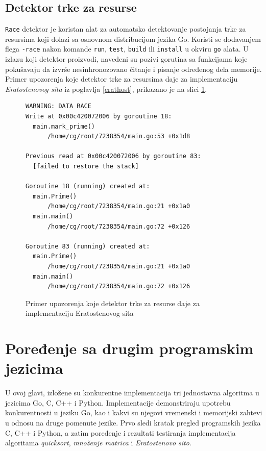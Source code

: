 \documentclass[12pt,oneside]{memoir}
\begin{document}
\section{Detektor trke za resurse} \label{datarace}

\texttt{Race} detektor je koristan alat za automatsko detektovanje postojanja trke za resursima koji dolazi sa osnovnom distribucijom jezika Go. Koristi se dodavanjem flega \texttt{-race} nakon komande \texttt{run}, \texttt{test}, \texttt{build} ili \texttt{install} u okviru \texttt{go} alata. U izlazu koji detektor proizvodi, navedeni su pozivi gorutina sa funkcijama koje pokušavaju da izvrše nesinhronozovano čitanje i pisanje određenog dela memorije. Primer upozorenja koje detektor trke za resursima daje za implementaciju \textit{Eratostenovog sita} iz poglavlja \ref{erathost}, prikazano je na slici \ref{fig:datarace}.

\begin{figure}
\begin{center}

\begin{Verbatim}[fontsize=\small]
WARNING: DATA RACE
Write at 0x00c420072006 by goroutine 18:
  main.mark_prime()
      /home/cg/root/7238354/main.go:53 +0x1d8

Previous read at 0x00c420072006 by goroutine 83:
  [failed to restore the stack]

Goroutine 18 (running) created at:
  main.Prime()
      /home/cg/root/7238354/main.go:21 +0x1a0
  main.main()
      /home/cg/root/7238354/main.go:72 +0x126

Goroutine 83 (running) created at:
  main.Prime()
      /home/cg/root/7238354/main.go:21 +0x1a0
  main.main()
      /home/cg/root/7238354/main.go:72 +0x126
\end{Verbatim}

\caption{Primer upozorenja koje detektor trke za resurse daje za implementaciju Eratostenovog sita}
\label{fig:datarace}
\end{center}
\end{figure}



\chapter {Poređenje sa drugim programskim jezicima}
U ovoj glavi, izložene su konkurentne implementacija tri jednostavna algoritma u jezicima Go, C, C++ i Python.  Implementacije demonstriraju upotrebu konkurentnosti u jeziku Go, kao i kakvi su njegovi vremenski i memorijski zahtevi u odnosu na druge pomenute jezike. Prvo sledi kratak pregled programskih jezika C, C++ i Python, a zatim poređenje i rezultati testiranja implementacija algoritama \textit{quicksort}, \textit{množenje matrica} i \textit{Eratostenovo sito}.
\end{document}
